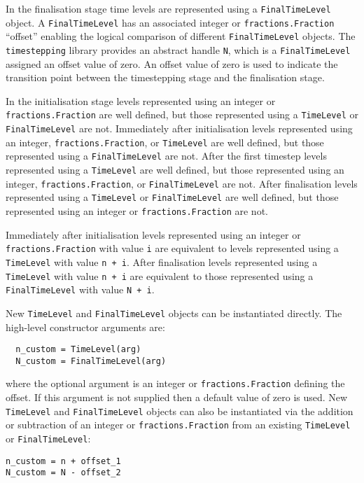 \documentclass[a4paper]{book}
\begin{document}
In the finalisation stage time levels are represented using a
\verb+FinalTimeLevel+ object. A \verb+FinalTimeLevel+ has an associated integer
or \verb+fractions.Fraction+ ``offset'' enabling the logical comparison of
different \verb+FinalTimeLevel+ objects. The \verb+timestepping+ library
provides an abstract handle \verb+N+, which is a \linebreak
\verb+FinalTimeLevel+ assigned an offset value of zero. An offset value of zero
is used to indicate the transition point between the timestepping stage and the
finalisation stage.

In the initialisation stage levels represented using an integer or \linebreak
\verb+fractions.Fraction+ are well defined, but those represented using a
\verb+TimeLevel+ or \verb+FinalTimeLevel+ are not. Immediately after
initialisation levels represented using an integer, \verb+fractions.Fraction+,
or \verb+TimeLevel+ are well defined, but those represented using a
\verb+FinalTimeLevel+ are not. After the first timestep levels represented using
a \verb+TimeLevel+ are well defined, but those represented using an integer,
\verb+fractions.Fraction+, or \verb+FinalTimeLevel+ are not. After finalisation
levels represented using a \verb+TimeLevel+ or \verb+FinalTimeLevel+ are well
defined, but those represented using an integer or \verb+fractions.Fraction+ are
not.

Immediately after initialisation levels represented using an integer or
\linebreak \verb+fractions.Fraction+ with value \verb+i+ are equivalent to
levels represented using a \verb+TimeLevel+ with value \verb=n + i=. After
finalisation levels represented using a \verb+TimeLevel+ with value \verb=n + i=
are equivalent to those represented using a \linebreak \verb+FinalTimeLevel+
with value \verb=N + i=.

New \verb+TimeLevel+ and \verb+FinalTimeLevel+ objects can be instantiated
directly. The high-level constructor arguments are:
\begin{lstlisting}
  n_custom = TimeLevel(arg)
  N_custom = FinalTimeLevel(arg)
\end{lstlisting}
where the optional argument is an integer or \verb+fractions.Fraction+ defining
the offset. If this argument is not supplied then a default value of zero is
used. New \verb+TimeLevel+ and \verb+FinalTimeLevel+ objects can also be
instantiated via the addition or subtraction of an integer or
\verb+fractions.Fraction+ from an existing \verb+TimeLevel+ or
\verb+FinalTimeLevel+:
\begin{lstlisting}
n_custom = n + offset_1
N_custom = N - offset_2
\end{lstlisting}
\end{document}
